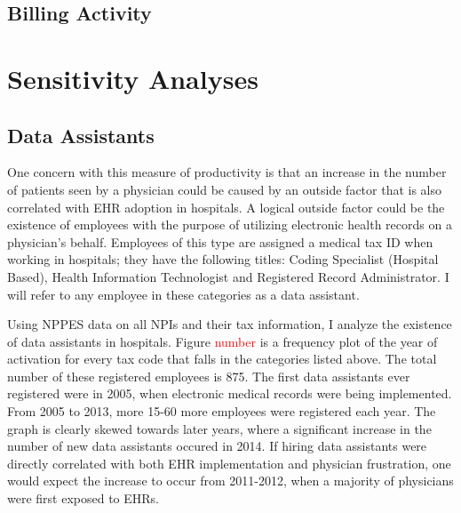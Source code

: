 \documentclass[11pt]{article}
\begin{document}
\subsection{Billing Activity}

\section{Sensitivity Analyses}

\subsection{Data Assistants}

One concern with this measure of productivity is that an increase in the number of patients seen by a physician could be caused by an outside factor that is also correlated with EHR adoption in hospitals. A logical outside factor could be the existence of employees with the purpose of utilizing electronic health records on a physician's behalf. Employees of this type are assigned a medical tax ID when working in hospitals; they have the following titles: Coding Specialist (Hospital Based), Health Information Technologist and Registered Record Administrator. I will refer to any employee in these categories as a data assistant. 

Using NPPES data on all NPIs and their tax information, I analyze the existence of data assistants in hospitals. Figure \textcolor{red}{number} is a frequency plot of the year of activation for every tax code that falls in the categories listed above. The total number of these registered employees is 875. The first data assistants ever registered were in 2005, when electronic medical records were being implemented. From 2005 to 2013, more 15-60 more employees were registered each year. The graph is clearly skewed towards later years, where a significant increase in the number of new data assistants occured in 2014. If hiring data assistants were directly correlated with both EHR implementation and physician frustration, one would expect the increase to occur from 2011-2012, when a majority of physicians were first exposed to EHRs. 
\end{document}
